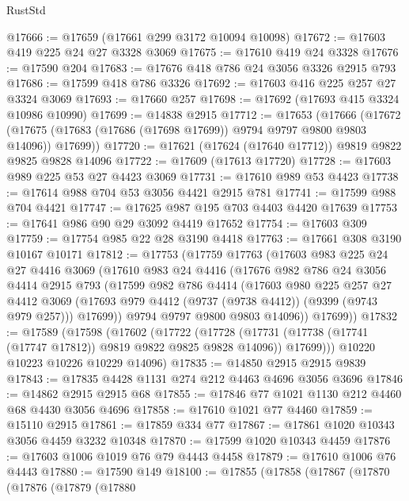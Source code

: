 \begin{lexlean}{RustStd}
\begin{coremodule}
@17666 := @17659 (@17661 @299 @3172 @10094 @10098)
@17672 := @17603 @419 @225 @24 @27 @3328 @3069
@17675 := @17610 @419 @24 @3328
@17676 := @17590 @204
@17683 := @17676 @418 @786 @24 @3056 @3326 @2915 @793
@17686 := @17599 @418 @786 @3326
@17692 := @17603 @416 @225 @257 @27 @3324 @3069
@17693 := @17660 @257
@17698 := @17692 (@17693 @415 @3324 @10986 @10990)
@17699 := @14838 @2915
@17712 := @17653
    (@17666
      (@17672 (@17675 (@17683 (@17686 (@17698 @17699)) @9794 @9797 @9800 @9803 @14096)) @17699))
@17720 := @17621 (@17624 (@17640 @17712)) @9819 @9822 @9825 @9828 @14096
@17722 := @17609 (@17613 @17720)
@17728 := @17603 @989 @225 @53 @27 @4423 @3069
@17731 := @17610 @989 @53 @4423
@17738 := @17614 @988 @704 @53 @3056 @4421 @2915 @781
@17741 := @17599 @988 @704 @4421
@17747 := @17625 @987 @195 @703 @4403 @4420 @17639
@17753 := @17641 @986 @90 @29 @3092 @4419 @17652
@17754 := @17603 @309
@17759 := @17754 @985 @22 @28 @3190 @4418
@17763 := @17661 @308 @3190 @10167 @10171
@17812 := @17753
    (@17759
      @17763
      (@17603
        @983
        @225
        @24
        @27
        @4416
        @3069
        (@17610
          @983
          @24
          @4416
          (@17676
            @982
            @786
            @24
            @3056
            @4414
            @2915
            @793
            (@17599
              @982
              @786
              @4414
              (@17603
                @980
                @225
                @257
                @27
                @4412
                @3069
                (@17693 @979 @4412 (@9737 (@9738 @4412)) (@9399 (@9743 @979 @257)))
                @17699))
            @9794
            @9797
            @9800
            @9803
            @14096))
        @17699))
@17832 := @17589
    (@17598
      (@17602
        (@17722
          (@17728
            (@17731 (@17738 (@17741 (@17747 @17812)) @9819 @9822 @9825 @9828 @14096))
            @17699)))
      @10220
      @10223
      @10226
      @10229
      @14096)
@17835 := @14850 @2915 @2915 @9839
@17843 := @17835 @4428 @1131 @274 @212 @4463 @4696 @3056 @3696
@17846 := @14862 @2915 @2915 @68
@17855 := @17846 @77 @1021 @1130 @212 @4460 @68 @4430 @3056 @4696
@17858 := @17610 @1021 @77 @4460
@17859 := @15110 @2915
@17861 := @17859 @334 @77
@17867 := @17861 @1020 @10343 @3056 @4459 @3232 @10348
@17870 := @17599 @1020 @10343 @4459
@17876 := @17603 @1006 @1019 @76 @79 @4443 @4458
@17879 := @17610 @1006 @76 @4443
@17880 := @17590 @149
@18100 := @17855
    (@17858
      (@17867
        (@17870
          (@17876
            (@17879
              (@17880

\end{coremodule}
\end{lexlean}
